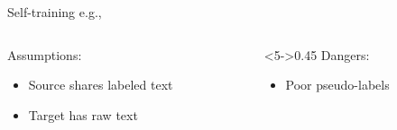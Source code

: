 \documentclass[14pt]{beamer}
\begin{document}
\begin{frame}{Self-training \hfill\small e.g., \cite{yarowsky-1995-unsupervised,ruder-plank-2018-strong}}

\begin{columns}
\begin{column}{0.53\textwidth}
Assumptions:
\begin{itemize}
\item Source shares labeled text
\item Target has raw text
\end{itemize}
\end{column}
\begin{column}<5->{0.45\textwidth}
Dangers:
\begin{itemize}
\item Poor pseudo-labels
\end{itemize}
\end{column}
\end{columns}
\end{frame}
\end{document}
